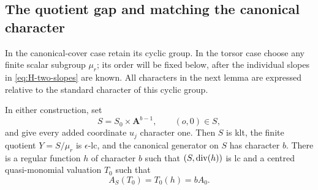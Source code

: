 \subsection{The quotient gap and matching the canonical character}

In the canonical-cover case retain its cyclic group.  In the torsor
case choose any finite scalar subgroup $\mu_r$; its order will be fixed
below, after the individual slopes in \eqref{eq:H-two-slopes} are known.
All characters in the next lemma are expressed relative to the standard
character of this cyclic group.

\begin{lemma}\label{lem:H-padding}
In either construction, set
\[
 S=S_0\times\mathbf A^{b-1},
 \qquad (o,0)\in S,
\]
and give every added coordinate $u_j$ character one.  Then $S$ is klt,
the finite quotient $Y=S/\mu_r$ is $\epsilon$-lc, and the canonical
generator on $S$ has character $b$.  There is a regular function $h$ of
character $b$ such that $(S,\operatorname{div}(h))$ is lc and a centred
quasi-monomial valuation $T_0$ such that
\begin{equation}\label{eq:H-padding-equality}
 A_S(T_0)=T_0(h)=bA_0.
\end{equation}
\end{lemma}
